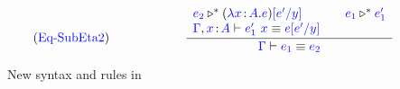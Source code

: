 \begin{figure}
	\begin{equation}
		\tag{\helper{Eq-SubEta2}}
		\qquad\qquad\qquad
		\frac
			{\begin{array}{l @{\qquad} l}
			 \helper{e_2} \triangleright^* (\helper{\lambda x} \goodcolon \helper{A} . \helper{e})\helper{\sub{e'}{y}} &
			 \helper{e_1} \triangleright^* \helper{e_1'} \\
			 \helper{\Gamma}, \helper{x} \goodcolon \helper{A} \vdash \helper{e_1'}\ \helper{x} \equiv \helper{e\sub{e'}{y}}
			 \end{array}
			 }
			{\helper{\Gamma} \vdash \helper{e_1} \equiv \helper{e_2}}
	\end{equation}
\label{fig: ccs}
\caption{New syntax and rules in {\ccs}}
\end{figure}










